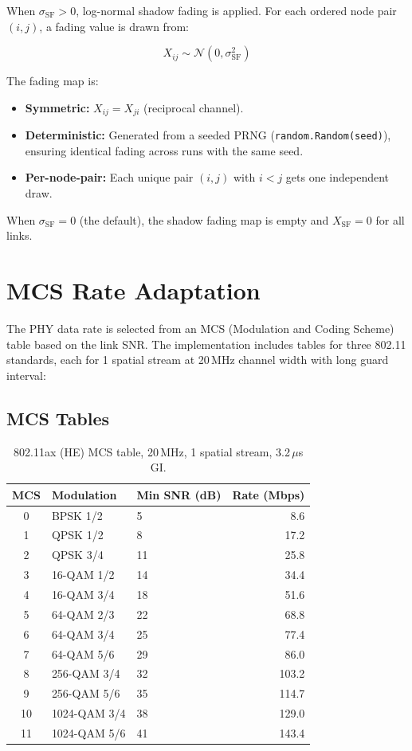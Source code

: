 \documentclass[11pt,letterpaper]{article}
\begin{document}
When $\sigma_\text{SF} > 0$, log-normal shadow fading is applied.  For each
ordered node pair $(i, j)$, a fading value is drawn from:

\begin{equation}
X_{ij} \sim \mathcal{N}(0, \sigma_\text{SF}^2)
\end{equation}

The fading map is:
\begin{itemize}[itemsep=2pt]
\item \textbf{Symmetric:} $X_{ij} = X_{ji}$ (reciprocal channel).
\item \textbf{Deterministic:} Generated from a seeded PRNG (\texttt{random.Random(seed)}),
  ensuring identical fading across runs with the same seed.
\item \textbf{Per-node-pair:} Each unique pair $(i, j)$ with $i < j$ gets one
  independent draw.
\end{itemize}

When $\sigma_\text{SF} = 0$ (the default), the shadow fading map is empty and
$X_\text{SF} = 0$ for all links.

\section{MCS Rate Adaptation}
\label{sec:mcs}

The PHY data rate is selected from an MCS (Modulation and Coding Scheme) table
based on the link SNR.  The implementation includes tables for three 802.11
standards, each for 1 spatial stream at 20\,MHz channel width with long guard
interval:

\subsection{MCS Tables}

\begin{table}[h]
\centering
\caption{802.11ax (HE) MCS table, 20\,MHz, 1 spatial stream, 3.2\,$\mu$s GI.}
\label{tab:mcs_ax}
\begin{tabular}{@{}cllr@{}}
\toprule
\textbf{MCS} & \textbf{Modulation} & \textbf{Min SNR (dB)} & \textbf{Rate (Mbps)} \\
\midrule
0  & BPSK 1/2      & 5  & 8.6 \\
1  & QPSK 1/2      & 8  & 17.2 \\
2  & QPSK 3/4      & 11 & 25.8 \\
3  & 16-QAM 1/2    & 14 & 34.4 \\
4  & 16-QAM 3/4    & 18 & 51.6 \\
5  & 64-QAM 2/3    & 22 & 68.8 \\
6  & 64-QAM 3/4    & 25 & 77.4 \\
7  & 64-QAM 5/6    & 29 & 86.0 \\
8  & 256-QAM 3/4   & 32 & 103.2 \\
9  & 256-QAM 5/6   & 35 & 114.7 \\
10 & 1024-QAM 3/4  & 38 & 129.0 \\
11 & 1024-QAM 5/6  & 41 & 143.4 \\
\bottomrule
\end{tabular}
\end{table}
\end{document}
